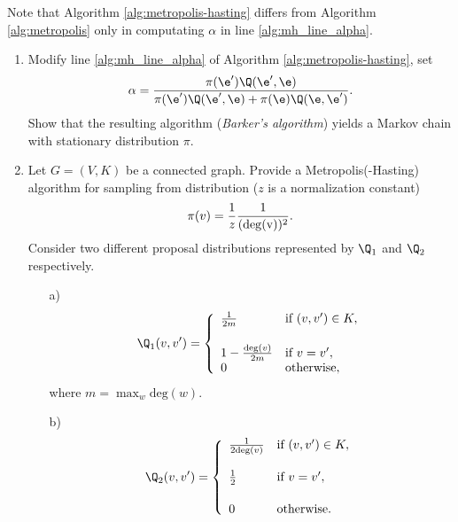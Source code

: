 \documentclass[a4paper,12pt]{article}
\begin{document}
Note that Algorithm \ref{alg:metropolis-hasting} differs from Algorithm \ref{alg:metropolis} only
in  computating $\alpha$ in line \ref{alg:mh_line_alpha}.

\begin{enumerate}[resume]
  \item  Modify line \ref{alg:mh_line_alpha} of Algorithm \ref{alg:metropolis-hasting}, set
  $$\alpha={\pi(\e')\Q(\e',\e) \over \pi(\e')\Q(\e',\e) +\pi(\e)\Q(\e,\e') }.$$
  Show that the resulting algorithm (\textsl{Barker's algorithm})  yields a Markov chain with stationary distribution $\pi$.

\item Let $G=(V,K)$ be a connected graph.
Provide a Metropolis(-Hasting) algorithm for sampling from distribution ($z$ is a normalization constant)
$$\pi(v)={1\over z}{1\over (\rm{deg}(v))^2}.$$
Consider two different proposal distributions represented by $\Q_1$ and $\Q_2$ respectively.
\begin{enumerate}
 \item[a)]
 $$\Q_1(v,v')=
\left\{
\begin{array}{llll}
{1\over 2m} & \textrm{if } (v,v')\in K,\\[14pt]
1-{\textrm{deg}(v)\over 2m}  & \textrm{if } v=v',\\
0 & \textrm{otherwise},
\end{array}
\right.$$
where $m= \max_{w} \textrm{deg}(w)$.
 \item[b)]
$$\Q_2(v,v')=
\left\{
\begin{array}{llll}
{1\over 2\textrm{deg}(v)} & \textrm{if } (v,v')\in K,\\[14pt]
{1\over 2}  & \textrm{if } v=v',\\[14pt]
0 & \textrm{otherwise}.
\end{array}
\right.$$
\end{enumerate}





\end{enumerate}
\end{document}
